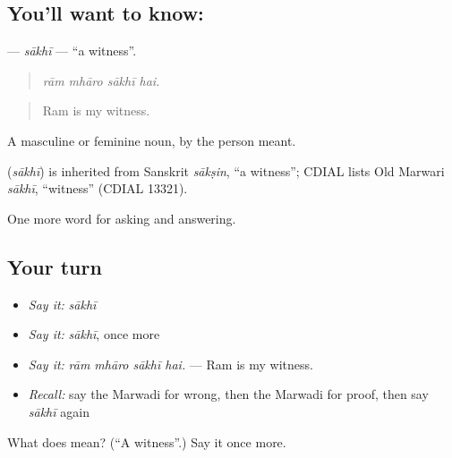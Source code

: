 \subsection*{You'll want to know: }
\textbf{} — \emph{sākhī} — \textquotedblleft{}a witness\textquotedblright{}.

\begin{quote}
   
\end{quote}

\begin{quote}
\emph{rām mhāro sākhī hai.}
\end{quote}

\begin{quote}
Ram is my witness.
\end{quote}

A masculine or feminine noun, by the person meant.

\begin{cousinweb}
\textbf{} (\emph{sākhī}) is inherited from Sanskrit \emph{sākṣin}, \textquotedblleft{}a witness\textquotedblright{}; CDIAL lists Old Marwari \emph{sākhī}, \textquotedblleft{}witness\textquotedblright{} (CDIAL 13321).
\end{cousinweb}

\begin{grammarlens}[title={What you've built}]
One more word for asking and answering.
\end{grammarlens}

\subsection*{Your turn}
\begin{itemize}
\raggedright
  \item \emph{Say it:} \emph{sākhī}
  \item \emph{Say it:} \emph{sākhī}, once more
  \item \emph{Say it:} \emph{rām mhāro sākhī hai.} — Ram is my witness.
  \item \emph{Recall:} say the Marwadi for wrong, then the Marwadi for proof, then say \emph{sākhī} again
\end{itemize}

\begin{tcolorbox}[breakable,colback=teal!4,colframe=teal!35!black,title={Before you move on}]
What does  mean? (\textquotedblleft{}A witness\textquotedblright{}.) Say it once more.
\end{tcolorbox}
